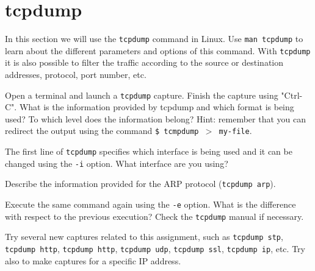 \section{tcpdump}

In this section we will use the \texttt{tcpdump} command in Linux. Use \texttt{man tcpdump} to learn about the different parameters and options of this command. With \texttt{tcpdump} it is also possible to filter the traffic according to the source or destination addresses, protocol, port number, etc.

Open a terminal and launch a \texttt{tcpdump} capture. Finish the capture using "Ctrl-C". What is the information provided by tcpdump and which format is being used? To which level does the information belong? Hint: remember that you can redirect the output using the command \texttt{\$ tcmpdump $>$ my-file}.

The first line of \texttt{tcpdump} specifies which interface is being used and it can be changed using the \texttt{-i} option. What interface are you using?

Describe the information provided for the ARP protocol (\texttt{tcpdump arp}).

Execute the same command again using the \texttt{-e} option. What is the difference with respect to the previous execution? Check the \texttt{tcpdump} manual if necessary.

Try several new captures related to this assignment, such as \texttt{tcpdump stp}, \texttt{tcpdump http}, \texttt{tcpdump http}, \texttt{tcpdump udp}, \texttt{tcpdump ssl}, \texttt{tcpdump ip}, etc. Try also to make captures for a specific IP address.
